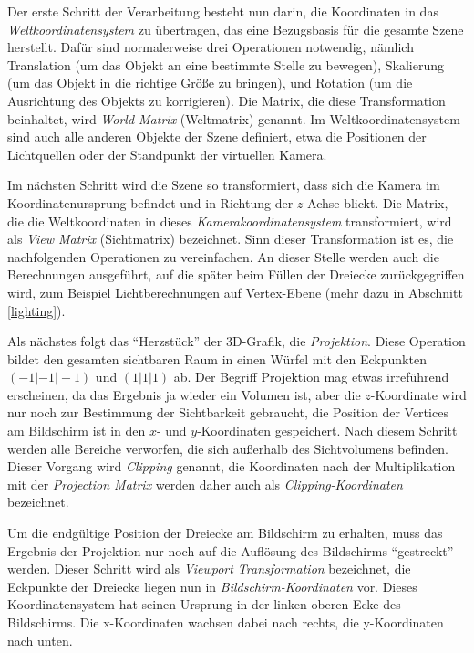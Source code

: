 Der erste Schritt der Verarbeitung besteht nun darin, die Koordinaten in das \emph{Weltkoordinatensystem} zu übertragen, das eine Bezugsbasis für die gesamte Szene herstellt. Dafür sind normalerweise drei Operationen notwendig, nämlich Translation (um das Objekt an eine bestimmte Stelle zu bewegen), Skalierung (um das Objekt in die richtige Größe zu bringen), und Rotation (um die Ausrichtung des Objekts zu korrigieren). Die Matrix, die diese Transformation beinhaltet, wird \emph{World Matrix} (Weltmatrix) genannt. Im Weltkoordinatensystem sind auch alle anderen Objekte der Szene definiert, etwa die Positionen der Lichtquellen oder der Standpunkt der virtuellen Kamera.

Im nächsten Schritt wird die Szene so transformiert, dass sich die Kamera im Koordinatenursprung befindet und in Richtung der $z$-Achse blickt. Die Matrix, die die Weltkoordinaten in dieses \emph{Kamerakoordinatensystem} transformiert, wird als \emph{View Matrix} (Sichtmatrix) bezeichnet. Sinn dieser Transformation ist es, die nachfolgenden Operationen zu vereinfachen. An dieser Stelle werden auch die Berechnungen ausgeführt, auf die später beim Füllen der Dreiecke zurückgegriffen wird, zum Beispiel Lichtberechnungen auf Vertex-Ebene (mehr dazu in Abschnitt \ref{lighting}).

Als nächstes folgt das \enquote{Herzstück} der 3D-Grafik, die \emph{Projektion}. Diese Operation bildet den gesamten sichtbaren Raum in einen Würfel mit den Eckpunkten $(-1 | -1 | -1)$ und $(1 | 1 | 1)$ ab. Der Begriff Projektion mag etwas irreführend erscheinen, da das Ergebnis ja wieder ein Volumen ist, aber die $z$-Koordinate wird nur noch zur Bestimmung der Sichtbarkeit gebraucht, die Position der Vertices am Bildschirm ist in den $x$- und $y$-Koordinaten gespeichert. Nach diesem Schritt werden alle Bereiche verworfen, die sich außerhalb des Sichtvolumens befinden. Dieser Vorgang wird  \emph{Clipping} genannt, die Koordinaten nach der Multiplikation mit der \emph{Projection Matrix} werden daher auch als \emph{Clipping-Koordinaten} bezeichnet.

Um die endgültige Position der Dreiecke am Bildschirm zu erhalten, muss das Ergebnis der Projektion nur noch auf die Auflösung des Bildschirms \enquote{gestreckt} werden. Dieser Schritt wird als \emph{Viewport Transformation} bezeichnet, die Eckpunkte der Dreiecke liegen nun in \emph{Bildschirm-Koordinaten} vor. Dieses Koordinatensystem hat seinen Ursprung in der linken oberen Ecke des Bildschirms. Die x-Koordinaten wachsen dabei nach rechts, die y-Koordinaten nach unten.

